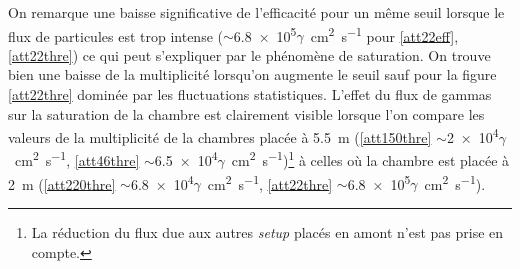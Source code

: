 On remarque une baisse significative de l'efficacité pour un même seuil lorsque le flux de particules est trop intense ($\sim$\num{6.8e5}$\gamma$\si{\per\square\centi\meter\per\second} pour \ref{att22eff}, \ref{att22thre}) ce qui peut s'expliquer par le phénomène de saturation. On trouve bien une baisse de la multiplicité lorsqu'on augmente le seuil sauf pour la figure \ref{att22thre} dominée par les fluctuations statistiques. L'effet du flux de gammas sur la saturation de la chambre est clairement visible lorsque l'on compare les valeurs de la multiplicité de la chambres placée à \SI{5.5}{\meter} (\ref{att150thre} $\sim$\num{2e4}$\gamma$\si{\per\square\centi\meter\per\second}, \ref{att46thre} $\sim$\num{6.5e4}$\gamma$\si{\per\square\centi\meter\per\second})\footnote{La réduction du flux due aux autres \textit{setup} placés en amont n'est pas prise en compte.} à celles où la chambre est placée à \SI{2}{\meter} (\ref{att220thre} $\sim$\num{6.8e4}$\gamma$\si{\per\square\centi\meter\per\second}, \ref{att22thre} $\sim$\num{6.8e5}$\gamma$\si{\per\square\centi\meter\per\second}).

\vspace*{-0.2cm}
